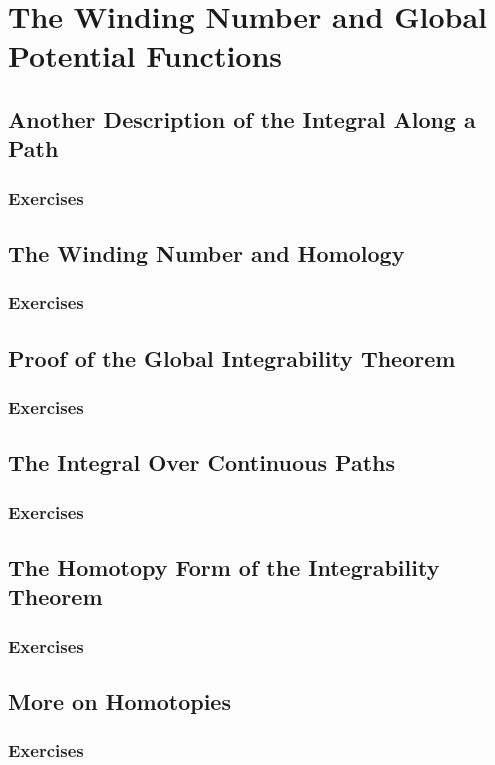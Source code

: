 \setcounter{chapter}{0}
\renewcommand{\thechapter}{16}
\chapter{The Winding Number and Global Potential Functions}\label{ch:16}
\setcounter{equation}{0}	        %

\section{Another Description of the Integral Along a Path}\label{sec:16.1}
\subsection*{Exercises}\label{sec:16.1_Exercises}
\section{The Winding Number and Homology}\label{sec:16.2}	
\subsection*{Exercises}\label{sec:16.2_Exercises}
\section{Proof of the Global Integrability Theorem}\label{sec:16.3}	
\subsection*{Exercises}\label{sec:16.3_Exercises}
\section{The Integral Over Continuous Paths}\label{sec:16.4}	
\subsection*{Exercises}\label{sec:16.4_Exercises}
\section{The Homotopy Form of the Integrability\\ Theorem}\label{sec:16.5}	
\subsection*{Exercises}\label{sec:16.5_Exercises}
\section{More on Homotopies}\label{sec:16.6}	
\subsection*{Exercises}\label{sec:16.6_Exercises}

